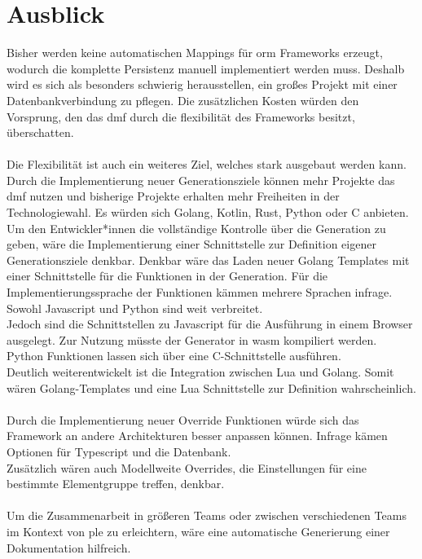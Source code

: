 \documentclass[./einleitung.tex]{subfiles}
\begin{document}
\section{Ausblick}\label{sec:ausblick}
Bisher werden keine automatischen Mappings für \acrshort{orm} Frameworks erzeugt, wodurch die komplette Persistenz manuell implementiert werden muss.
    Deshalb wird es sich als besonders schwierig herausstellen, ein großes Projekt mit einer Datenbankverbindung zu pflegen.
    Die zusätzlichen Kosten würden den Vorsprung, den das \acrshort{dmf} durch die flexibilität des Frameworks besitzt, überschatten.
    \\\\
    Die Flexibilität ist auch ein weiteres Ziel, welches stark ausgebaut werden kann.
    Durch die Implementierung neuer Generationsziele können mehr Projekte das \acrshort{dmf} nutzen und bisherige Projekte erhalten mehr Freiheiten in der Technologiewahl.
    Es würden sich Golang, Kotlin, Rust, Python oder C anbieten.\\
    Um den Entwickler*innen die vollständige Kontrolle über die Generation zu geben, wäre die Implementierung einer Schnittstelle zur Definition eigener Generationsziele denkbar.
    Denkbar wäre das Laden neuer Golang Templates mit einer Schnittstelle für die Funktionen in der Generation.
    Für die Implementierungssprache der Funktionen kämmen mehrere Sprachen infrage.
    Sowohl Javascript und Python sind weit verbreitet.\\
    Jedoch sind die Schnittstellen zu Javascript für die Ausführung in einem Browser ausgelegt.
    Zur Nutzung müsste der Generator in \acrfull{wasm} kompiliert werden.\\
    Python Funktionen lassen sich über eine C-Schnittstelle ausführen.\\
    Deutlich weiterentwickelt ist die Integration zwischen Lua und Golang.
    Somit wären Golang-Templates und eine Lua Schnittstelle zur Definition wahrscheinlich.
    \\\\
    Durch die Implementierung neuer Override Funktionen würde sich das Framework an andere Architekturen besser anpassen können.
    Infrage kämen Optionen für Typescript und die Datenbank.\\
    Zusätzlich wären auch Modellweite Overrides, die Einstellungen für eine bestimmte Elementgruppe treffen, denkbar.
    \\\\
    Um die Zusammenarbeit in größeren Teams oder zwischen verschiedenen Teams im Kontext von \acrshort{ple} zu erleichtern, wäre eine automatische Generierung einer Dokumentation hilfreich.
\end{document}
